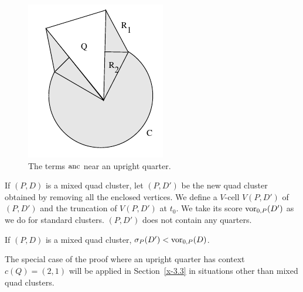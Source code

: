 \begin{figure}[htb]
  \centering
  \includegraphics{PS/diag46.pdf}
  \caption{The terms $\operatorname{anc}$ near an upright quarter.}
  \label{fig:anchor-quarter:bis}
\end{figure}

\smallskip
If $(P,D)$ is a mixed quad cluster, let $(P,D')$ be the new quad
cluster obtained by removing all the enclosed vertices.  We define
a $V$-cell $V(P,D')$ of $(P,D')$ and the truncation of $V(P,D')$
at $t_0$. We take its score ${\operatorname{vor}}_{0,P}(D')$  as we do for
standard clusters.  $(P,D')$ does not contain any quarters.

\begin{lemma} \label{lemma:mixed-vor0}
If $(P,D)$ is a mixed quad cluster, $\sigma_P(D') <
\operatorname{vor}_{0,P}(D)$.
\end{lemma}

\begin{remark}
The special case of the proof where an upright quarter has context
$c(Q)=(2,1)$ will be applied in Section~\ref{x-3.3} in situations
other than mixed quad clusters.
\end{remark}


